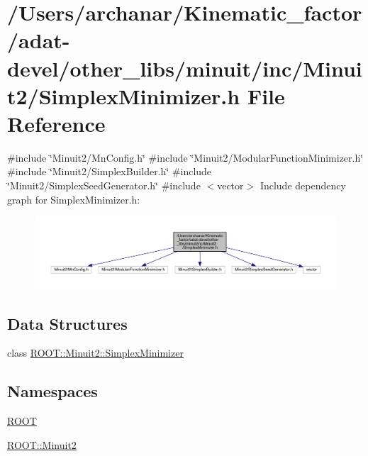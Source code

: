 \hypertarget{adat-devel_2other__libs_2minuit_2inc_2Minuit2_2SimplexMinimizer_8h}{}\section{/\+Users/archanar/\+Kinematic\+\_\+factor/adat-\/devel/other\+\_\+libs/minuit/inc/\+Minuit2/\+Simplex\+Minimizer.h File Reference}
\label{adat-devel_2other__libs_2minuit_2inc_2Minuit2_2SimplexMinimizer_8h}
{\ttfamily \#include \char`\"{}Minuit2/\+Mn\+Config.\+h\char`\"{}}\newline
{\ttfamily \#include \char`\"{}Minuit2/\+Modular\+Function\+Minimizer.\+h\char`\"{}}\newline
{\ttfamily \#include \char`\"{}Minuit2/\+Simplex\+Builder.\+h\char`\"{}}\newline
{\ttfamily \#include \char`\"{}Minuit2/\+Simplex\+Seed\+Generator.\+h\char`\"{}}\newline
{\ttfamily \#include $<$vector$>$}\newline
Include dependency graph for Simplex\+Minimizer.\+h\+:
\nopagebreak
\begin{figure}[H]
\begin{center}
\leavevmode
\includegraphics[width=350pt]{da/d13/adat-devel_2other__libs_2minuit_2inc_2Minuit2_2SimplexMinimizer_8h__incl}
\end{center}
\end{figure}
\subsection*{Data Structures}
\begin{DoxyCompactItemize}
\item 
class \mbox{\hyperlink{classROOT_1_1Minuit2_1_1SimplexMinimizer}{R\+O\+O\+T\+::\+Minuit2\+::\+Simplex\+Minimizer}}
\end{DoxyCompactItemize}
\subsection*{Namespaces}
\begin{DoxyCompactItemize}
\item 
 \mbox{\hyperlink{namespaceROOT}{R\+O\+OT}}
\item 
 \mbox{\hyperlink{namespaceROOT_1_1Minuit2}{R\+O\+O\+T\+::\+Minuit2}}
\end{DoxyCompactItemize}
